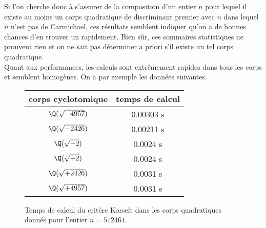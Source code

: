 Si l'on cherche donc à s'assurer de la composition d'un entier $n$ pour lequel il existe au moins un corps quadratique de discriminant premier avec $n$ dans lequel $n$ n'est pas de Carmichael, ces résultats semblent indiquer qu'on a de bonnes chances d'en trouver un rapidement. Bien sûr, ces sommaires statistiques ne prouvent rien et on ne sait pas déterminer a priori s'il existe un tel corps quadratique. \\

Quant aux performances, les calculs sont extrêmement rapides dans tous les corps et semblent homogènes. On a par exemple les données suivantes.

\begin{figure}[h!]
	\begin{center}
		\begin{tabular}{|c|c|}
			\hline
			corps cyclotomique & temps de calcul \\
			\hline
			\hline
			$\Q(\sqrt{-4957})$ & 0.00303 s \\\hline
			$\Q(\sqrt{-2426})$ & 0.00211 s \\\hline
			$\Q(\sqrt{-2})$ & 0.0024 s \\\hline
			$\Q(\sqrt{+2})$ & 0.0024 s \\\hline
			$\Q(\sqrt{+2426})$ & 0.0031 s \\\hline
			$\Q(\sqrt{+4957})$ & 0.0031 s \\\hline
		\end{tabular}
		\caption{Temps de calcul du critère Korselt dans les corps quadratiques donnés pour l'entier $n=512461$.}
	\end{center}
\end{figure}
